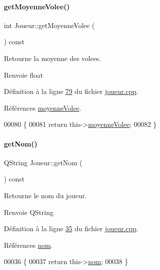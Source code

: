 \paragraph{\texorpdfstring{get\+Moyenne\+Volee()}{getMoyenneVolee()}}
{\footnotesize\ttfamily int Joueur\+::get\+Moyenne\+Volee (\begin{DoxyParamCaption}{ }\end{DoxyParamCaption}) const}



Retourne la moyenne des volees. 

\begin{DoxyReturn}{Renvoie}
float 
\end{DoxyReturn}


Définition à la ligne \hyperlink{joueur_8cpp_source_l00079}{79} du fichier \hyperlink{joueur_8cpp_source}{joueur.\+cpp}.



Références \hyperlink{joueur_8h_source_l00044}{moyenne\+Volee}.


\begin{DoxyCode}
00080 \{
00081     \textcolor{keywordflow}{return} this->\hyperlink{class_joueur_ac5641a2a8fc1deebe5bba27bf21eb446}{moyenneVolee};
00082 \}
\end{DoxyCode}
\mbox{\label{class_joueur_a1d7082ab1f926eae1bd6834e901751a7}} 
\paragraph{\texorpdfstring{get\+Nom()}{getNom()}}
{\footnotesize\ttfamily Q\+String Joueur\+::get\+Nom (\begin{DoxyParamCaption}{ }\end{DoxyParamCaption}) const}



Retourne le nom du joueur. 

\begin{DoxyReturn}{Renvoie}
Q\+String 
\end{DoxyReturn}


Définition à la ligne \hyperlink{joueur_8cpp_source_l00035}{35} du fichier \hyperlink{joueur_8cpp_source}{joueur.\+cpp}.



Références \hyperlink{joueur_8h_source_l00041}{nom}.


\begin{DoxyCode}
00036 \{
00037     \textcolor{keywordflow}{return} this->\hyperlink{class_joueur_ab06d7f1e6b482299bb03919e0cd2166d}{nom};
00038 \}
\end{DoxyCode}
\mbox{\label{class_joueur_adf4397ffb7fcc340c2d2cc6c45edc8e2}} 
